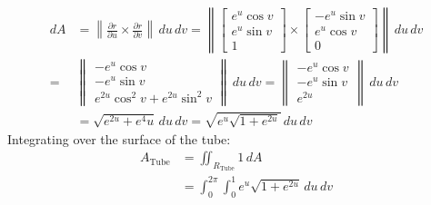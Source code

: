 \documentclass[a4paper, 11pt]{article}
\def\pp#1#2{\frac{\partial #1}{\partial #2}}
\begin{document}
\begin{enumerate}[label=(\alph*)]
\begin{itemize}
\begin{mdframed}
			            \begin{align*}
				            dA & = \left\|\pp ru \times \pp rv\right\| \,du\,dv  = \left\|
				            \begin{bmatrix}
					            e^u\cos v \\ e^u\sin v \\ 1
				            \end{bmatrix}\times
				            \begin{bmatrix}
					            -e^u\sin v \\
					            e^u\cos v  \\
					            0
				            \end{bmatrix}
				            \right\| \,du\,dv                                                      \\
				            =  & \left\|
				            \begin{matrix}
					            -e^u\cos v \\ -e^u\sin v\\  e^{2u}\cos^2v +  e^{2u}\sin^2v
				            \end{matrix}
				            \right\| \,du \,dv
				            =\left\|
				            \begin{matrix}
					            -e^u\cos v \\ -e^u\sin v\\  e^{2u}
				            \end{matrix}
				            \right\| \,du \,dv                                                     \\
				               & =\sqrt{e^{2u} + e^4u}\,du\,dv = \sqrt{e^u\sqrt{1+e^{2u}}}\,du\,dv
			            \end{align*}
			            Integrating over the surface of the tube:
			            \begin{align*}
				            A_\text{Tube} & =  \iint_{R_\text{Tube}} 1 \,dA                          \\
				                          & =  \int_0^{2\pi}\int_0^1 e^{u}\sqrt{1+e^{2u}} \,du \, dv \\
			            \end{align*}

		            \end{mdframed}


\end{itemize}
\end{enumerate}
\end{document}
